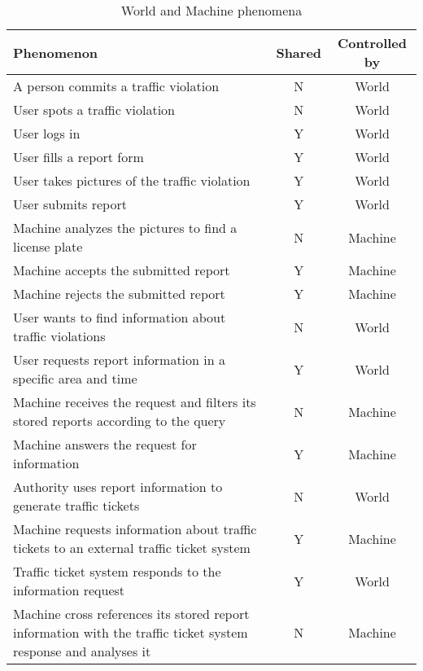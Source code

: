\begin{table}[H]
    \centering
    \begin{tabular}{|p{10cm}|c|c|}
    \hline
    \textbf{Phenomenon} & \textbf{Shared} & \textbf{Controlled by} \\ \hline
    A person commits a traffic violation & N & World \\ \hline
    User spots a traffic violation & N & World \\ \hline
    User logs in & Y & World \\ \hline
    User fills a report form & Y & World \\ \hline
    User takes pictures of the traffic violation & Y & World \\ \hline
    User submits report & Y & World \\ \hline
    Machine analyzes the pictures to find a license plate & N & Machine \\ \hline
    Machine accepts the submitted report & Y & Machine \\ \hline
    Machine rejects the submitted report & Y & Machine \\ \hline
    User wants to find information about traffic violations & N & World \\ \hline
    User requests report information in a specific area and time & Y & World \\ \hline
    Machine receives the request and filters its stored reports according to the query & N & Machine \\ \hline
    Machine answers the request for information & Y & Machine \\ \hline
    Authority uses report information to generate traffic tickets & N & World \\ \hline
    Machine requests information about traffic tickets to an external traffic ticket system & Y & Machine \\ \hline
    Traffic ticket system responds to the information request & Y & World \\ \hline
    Machine cross references its stored report information with the traffic ticket system response and analyses it & N & Machine \\ \hline
    \end{tabular}
    \caption{\label{tbl:phenomena} World and Machine phenomena}
    \end{table}

